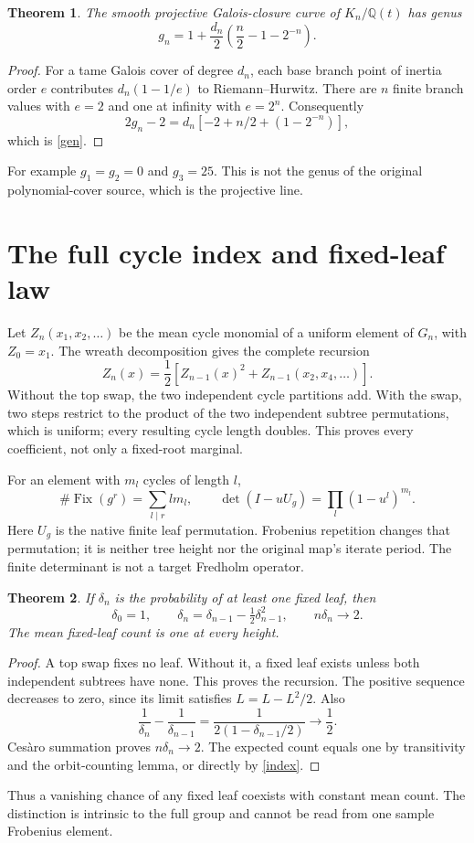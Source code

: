\documentclass[10pt]{article}
\newtheorem{theorem}{Theorem}
\newcommand{\Fix}{\operatorname{Fix}}
\begin{document}
\begin{theorem}\label{genus}
The smooth projective Galois-closure curve of $K_n/\mathbb Q(t)$ has genus
\begin{equation}\label{gen}
 g_n=1+\frac{d_n}{2}\left(\frac n2-1-2^{-n}\right).
\end{equation}
\end{theorem}
\begin{proof}
For a tame Galois cover of degree $d_n$, each base branch point of inertia
order $e$ contributes $d_n(1-1/e)$ to Riemann--Hurwitz.
There are $n$ finite branch values with $e=2$ and one at infinity with
$e=2^n$. Consequently
\[
 2g_n-2=d_n[-2+n/2+(1-2^{-n})],
\]
which is \eqref{gen}.
\end{proof}
For example $g_1=g_2=0$ and $g_3=25$.
This is not the genus of the original polynomial-cover source,
which is the projective line.

\section{The full cycle index and fixed-leaf law}
Let $Z_n(x_1,x_2,\ldots)$ be the mean cycle monomial of a uniform element
of $G_n$, with $Z_0=x_1$.
The wreath decomposition gives the complete recursion
\begin{equation}\label{index}
 Z_n(x)=\frac12\left[Z_{n-1}(x)^2+
                 Z_{n-1}(x_2,x_4,\ldots)\right].
\end{equation}
Without the top swap, the two independent cycle partitions add.
With the swap, two steps restrict to the product of the two independent
subtree permutations, which is uniform; every resulting cycle length doubles.
This proves every coefficient, not only a fixed-root marginal.

For an element with $m_l$ cycles of length $l$,
\[
 \#\Fix(g^r)=\sum_{l\mid r}lm_l,\qquad
 \det(I-uU_g)=\prod_l(1-u^l)^{m_l}.
\]
Here $U_g$ is the native finite leaf permutation. Frobenius repetition
changes that permutation; it is neither tree height nor the original
map's iterate period. The finite determinant is not a target Fredholm operator.

\begin{theorem}\label{fpp}
If $\delta_n$ is the probability of at least one fixed leaf, then
\[
 \delta_0=1,\qquad
 \delta_n=\delta_{n-1}-\tfrac12\delta_{n-1}^2,\qquad
 n\delta_n\longrightarrow2.
\]
The mean fixed-leaf count is one at every height.
\end{theorem}
\begin{proof}
A top swap fixes no leaf. Without it, a fixed leaf exists unless both
independent subtrees have none. This proves the recursion.
The positive sequence decreases to zero, since its limit satisfies
$L=L-L^2/2$. Also
\[
 \frac1{\delta_n}-\frac1{\delta_{n-1}}
   =\frac1{2(1-\delta_{n-1}/2)}\longrightarrow\frac12 .
\]
Cesàro summation proves $n\delta_n\to2$. The expected count equals one
by transitivity and the orbit-counting lemma, or directly by
\eqref{index}.
\end{proof}
Thus a vanishing chance of any fixed leaf coexists with constant mean count.
The distinction is intrinsic to the full group and cannot be read from one
sample Frobenius element.
\fi
\end{document}
